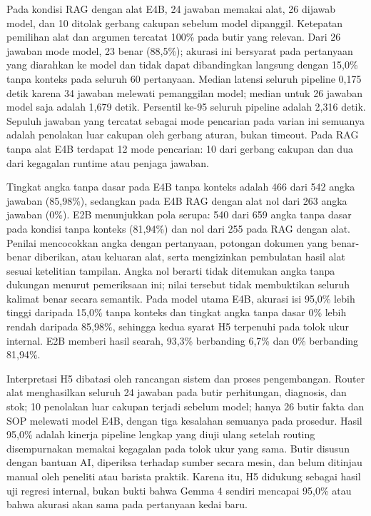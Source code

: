 Pada kondisi RAG dengan alat E4B, 24 jawaban memakai alat, 26 dijawab model, dan 10 ditolak gerbang cakupan sebelum model dipanggil. Ketepatan pemilihan alat dan argumen tercatat 100\% pada butir yang relevan. Dari 26 jawaban mode model, 23 benar (88,5\%); akurasi ini bersyarat pada pertanyaan yang diarahkan ke model dan tidak dapat dibandingkan langsung dengan 15,0\% tanpa konteks pada seluruh 60 pertanyaan. Median latensi seluruh pipeline 0,175 detik karena 34 jawaban melewati pemanggilan model; median untuk 26 jawaban model saja adalah 1,679 detik. Persentil ke-95 seluruh pipeline adalah 2,316 detik. Sepuluh jawaban yang tercatat sebagai mode pencarian pada varian ini semuanya adalah penolakan luar cakupan oleh gerbang aturan, bukan timeout. Pada RAG tanpa alat E4B terdapat 12 mode pencarian: 10 dari gerbang cakupan dan dua dari kegagalan runtime atau penjaga jawaban.

Tingkat angka tanpa dasar pada E4B tanpa konteks adalah 466 dari 542 angka jawaban (85,98\%), sedangkan pada E4B RAG dengan alat nol dari 263 angka jawaban (0\%). E2B menunjukkan pola serupa: 540 dari 659 angka tanpa dasar pada kondisi tanpa konteks (81,94\%) dan nol dari 255 pada RAG dengan alat. Penilai mencocokkan angka dengan pertanyaan, potongan dokumen yang benar-benar diberikan, atau keluaran alat, serta mengizinkan pembulatan hasil alat sesuai ketelitian tampilan. Angka nol berarti tidak ditemukan angka tanpa dukungan menurut pemeriksaan ini; nilai tersebut tidak membuktikan seluruh kalimat benar secara semantik. Pada model utama E4B, akurasi isi 95,0\% lebih tinggi daripada 15,0\% tanpa konteks dan tingkat angka tanpa dasar 0\% lebih rendah daripada 85,98\%, sehingga kedua syarat H5 terpenuhi pada tolok ukur internal. E2B memberi hasil searah, 93,3\% berbanding 6,7\% dan 0\% berbanding 81,94\%.

Interpretasi H5 dibatasi oleh rancangan sistem dan proses pengembangan. Router alat menghasilkan seluruh 24 jawaban pada butir perhitungan, diagnosis, dan stok; 10 penolakan luar cakupan terjadi sebelum model; hanya 26 butir fakta dan SOP melewati model E4B, dengan tiga kesalahan semuanya pada prosedur. Hasil 95,0\% adalah kinerja pipeline lengkap yang diuji ulang setelah routing disempurnakan memakai kegagalan pada tolok ukur yang sama. Butir disusun dengan bantuan AI, diperiksa terhadap sumber secara mesin, dan belum ditinjau manual oleh peneliti atau barista praktik. Karena itu, H5 didukung sebagai hasil uji regresi internal, bukan bukti bahwa Gemma 4 sendiri mencapai 95,0\% atau bahwa akurasi akan sama pada pertanyaan kedai baru.

